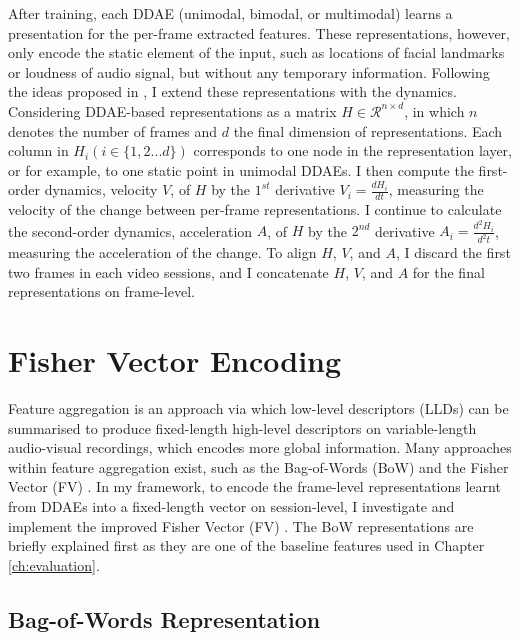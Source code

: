 After training, each DDAE (unimodal, bimodal, or multimodal) learns a presentation for the per-frame extracted features. These representations, however, only encode the static element of the input, such as locations of facial landmarks or loudness of audio signal, but without any temporary information. Following the ideas proposed in \cite{dibekliouglu2017}, I extend these representations with the dynamics. Considering DDAE-based representations as a matrix $H \in \mathcal{R}^{n \times d}$, in which $n$ denotes the number of frames and $d$ the final dimension of representations. Each column in $H_i(i \in \{1,2...d\})$ corresponds to one node in the representation layer, or for example, to one static point in unimodal DDAEs. I then compute the first-order dynamics, velocity $V$, of $H$ by the $1^{st}$ derivative $V_i = \frac{d H_i}{dt}$, measuring the velocity of the change between per-frame representations. I continue to calculate the second-order dynamics, acceleration $A$, of $H$ by the $2^{nd}$ derivative $A_i = \frac{d^2 H_i}{d^2 t}$, measuring the acceleration of the change. To align $H$, $V$, and $A$, I discard the first two frames in each video sessions, and I concatenate $H$, $V$, and $A$ for the final representations on frame-level.






\section{Fisher Vector Encoding}
\label{sec:fisher}

Feature aggregation is an approach via which low-level descriptors (LLDs) can be summarised to produce fixed-length high-level descriptors on variable-length audio-visual recordings, which encodes more global information. Many approaches within feature aggregation exist, such as the Bag-of-Words (BoW) \cite{csurka2004} and the Fisher Vector (FV) \cite{perronnin2010}. In my framework, to encode the frame-level representations learnt from DDAEs into a fixed-length vector on session-level, I investigate and implement the improved Fisher Vector (FV) \cite{perronnin2010, sanchez2013}. The BoW representations are briefly explained first as they are one of the baseline features used in Chapter \ref{ch:evaluation}.

\subsection{Bag-of-Words Representation}

